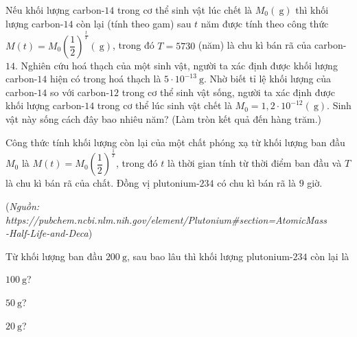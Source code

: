\begin{vd} 
	Nếu khối lượng carbon-$14$ trong cơ thể sinh vật lúc chết là $M_0(\mathrm{~g})$ thì khối lượng carbon-$14$ còn lại (tính theo gam) sau $t$ năm được tính theo công thức $M(t)=M_0\left(\dfrac{1}{2}\right)^{\tfrac{t}{T}}(\mathrm{~g})$, trong đó $T=5730$ (năm) là chu kì bán rã của carbon-$14$. Nghiên cứu hoá thạch của một sinh vật, người ta xác định được khối lượng carbon-$14$ hiện có trong hoá thạch là $5 \cdot 10^{-13} \mathrm{~g}$. Nhờ biết tỉ lệ khối lượng của carbon-$14$ so với carbon-$12$ trong cơ thể sinh vật sống, người ta xác định được khối lượng carbon-$14$ trong cơ thể lúc sinh vật chết là $M_0=1{,}2\cdot 10^{-12}(\mathrm{~g})$. Sinh vật này sống cách đây bao nhiêu năm? (Làm tròn kết quả đến hàng trăm.)
\end{vd}

\begin{vd} 
	Công thức tính khối lượng còn lại của một chất phóng xạ từ khối lượng ban đầu $M_0$ là $M(t)=M_0\left(\dfrac{1}{2}\right)^{\tfrac{1}{T}}$, trong đó $t$ là thời gian tính từ thời điểm ban đầu và $T$ là chu kì bán rã của chất. Đồng vị plutonium-$234$ có chu kì bán rã là $9$ giờ.
	\begin{flushright}
		(\textit{Nguồn: https://pubchem.ncbi.nlm.nih.gov/element/Plutonium\#section=AtomicMass\\-Half-Life-and-Deca})
	\end{flushright}
	Từ khối lượng ban đầu $200 \mathrm{~g}$, sau bao lâu thì khối lượng plutonium-$234$ còn lại là
	\begin{listEX}[3]
		\item $100 \mathrm{~g}$?
		\item $50 \mathrm{~g}$?
		\item $20 \mathrm{~g}$?
	\end{listEX}
\end{vd}

